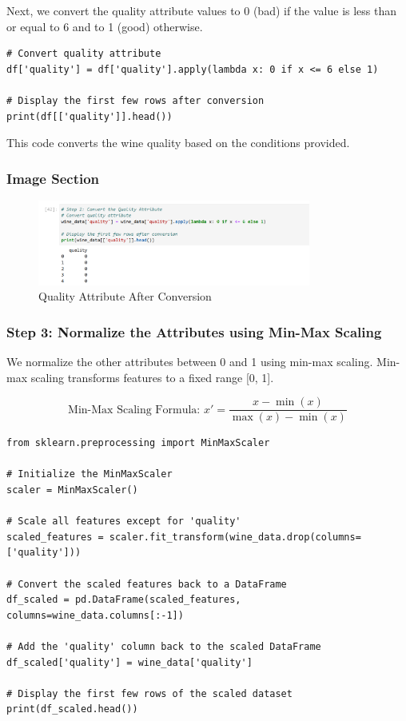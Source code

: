 \documentclass{exam}
\begin{document}
Next, we convert the quality attribute values to 0 (bad) if the value is less than or equal to 6 and to 1 (good) otherwise.

\begin{verbatim}
# Convert quality attribute
df['quality'] = df['quality'].apply(lambda x: 0 if x <= 6 else 1)

# Display the first few rows after conversion
print(df[['quality']].head())
\end{verbatim}

This code converts the wine quality based on the conditions provided.

\subsubsection*{Image Section}

\begin{figure}[h!]
    \centering
    \includegraphics[width=0.8\textwidth]{images/quality_conversion.png}
    \caption{Quality Attribute After Conversion}
    \label{fig:quality_conversion}
\end{figure}

\newpage

\subsubsection{Step 3: Normalize the Attributes using Min-Max Scaling}

We normalize the other attributes between 0 and 1 using min-max scaling. Min-max scaling transforms features to a fixed range [0, 1].

\[
\text{Min-Max Scaling Formula: } x' = \frac{x - \min(x)}{\max(x) - \min(x)}
\]

\begin{verbatim}
from sklearn.preprocessing import MinMaxScaler

# Initialize the MinMaxScaler
scaler = MinMaxScaler()

# Scale all features except for 'quality'
scaled_features = scaler.fit_transform(wine_data.drop(columns=['quality']))

# Convert the scaled features back to a DataFrame
df_scaled = pd.DataFrame(scaled_features, columns=wine_data.columns[:-1])

# Add the 'quality' column back to the scaled DataFrame
df_scaled['quality'] = wine_data['quality']

# Display the first few rows of the scaled dataset
print(df_scaled.head())
\end{verbatim}
\end{document}
